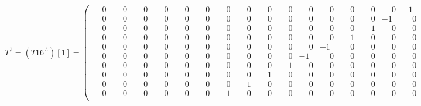 \documentclass[10pt]{article}
\begin{document}
\[
T^{1} = (T16^A)[1] = \left(\begin{smallmatrix}
\phantom{-}0 & \phantom{-}0 & \phantom{-}0 & \phantom{-}0 & \phantom{-}0 & \phantom{-}0 & \phantom{-}0 & \phantom{-}0 & \phantom{-}0 & \phantom{-}0 & \phantom{-}0 & \phantom{-}0 & \phantom{-}0 & \phantom{-}0 & \phantom{-}0 & -1 \\
\phantom{-}0 & \phantom{-}0 & \phantom{-}0 & \phantom{-}0 & \phantom{-}0 & \phantom{-}0 & \phantom{-}0 & \phantom{-}0 & \phantom{-}0 & \phantom{-}0 & \phantom{-}0 & \phantom{-}0 & \phantom{-}0 & \phantom{-}0 & -1 & \phantom{-}0 \\
\phantom{-}0 & \phantom{-}0 & \phantom{-}0 & \phantom{-}0 & \phantom{-}0 & \phantom{-}0 & \phantom{-}0 & \phantom{-}0 & \phantom{-}0 & \phantom{-}0 & \phantom{-}0 & \phantom{-}0 & \phantom{-}0 & \phantom{-}1 & \phantom{-}0 & \phantom{-}0 \\
\phantom{-}0 & \phantom{-}0 & \phantom{-}0 & \phantom{-}0 & \phantom{-}0 & \phantom{-}0 & \phantom{-}0 & \phantom{-}0 & \phantom{-}0 & \phantom{-}0 & \phantom{-}0 & \phantom{-}0 & \phantom{-}1 & \phantom{-}0 & \phantom{-}0 & \phantom{-}0 \\
\phantom{-}0 & \phantom{-}0 & \phantom{-}0 & \phantom{-}0 & \phantom{-}0 & \phantom{-}0 & \phantom{-}0 & \phantom{-}0 & \phantom{-}0 & \phantom{-}0 & \phantom{-}0 & -1 & \phantom{-}0 & \phantom{-}0 & \phantom{-}0 & \phantom{-}0 \\
\phantom{-}0 & \phantom{-}0 & \phantom{-}0 & \phantom{-}0 & \phantom{-}0 & \phantom{-}0 & \phantom{-}0 & \phantom{-}0 & \phantom{-}0 & \phantom{-}0 & -1 & \phantom{-}0 & \phantom{-}0 & \phantom{-}0 & \phantom{-}0 & \phantom{-}0 \\
\phantom{-}0 & \phantom{-}0 & \phantom{-}0 & \phantom{-}0 & \phantom{-}0 & \phantom{-}0 & \phantom{-}0 & \phantom{-}0 & \phantom{-}0 & \phantom{-}1 & \phantom{-}0 & \phantom{-}0 & \phantom{-}0 & \phantom{-}0 & \phantom{-}0 & \phantom{-}0 \\
\phantom{-}0 & \phantom{-}0 & \phantom{-}0 & \phantom{-}0 & \phantom{-}0 & \phantom{-}0 & \phantom{-}0 & \phantom{-}0 & \phantom{-}1 & \phantom{-}0 & \phantom{-}0 & \phantom{-}0 & \phantom{-}0 & \phantom{-}0 & \phantom{-}0 & \phantom{-}0 \\
\phantom{-}0 & \phantom{-}0 & \phantom{-}0 & \phantom{-}0 & \phantom{-}0 & \phantom{-}0 & \phantom{-}0 & \phantom{-}1 & \phantom{-}0 & \phantom{-}0 & \phantom{-}0 & \phantom{-}0 & \phantom{-}0 & \phantom{-}0 & \phantom{-}0 & \phantom{-}0 \\
\phantom{-}0 & \phantom{-}0 & \phantom{-}0 & \phantom{-}0 & \phantom{-}0 & \phantom{-}0 & \phantom{-}1 & \phantom{-}0 & \phantom{-}0 & \phantom{-}0 & \phantom{-}0 & \phantom{-}0 & \phantom{-}0 & \phantom{-}0 & \phantom{-}0 & \phantom{-}0 \\

\end{smallmatrix}\]
\end{document}
